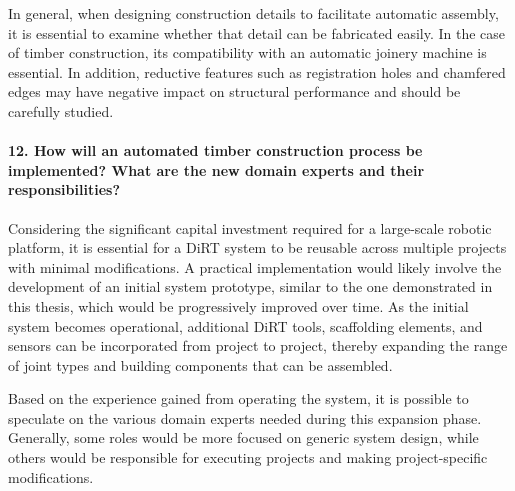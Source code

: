 In general, when designing construction details to facilitate automatic assembly, it is essential to examine whether that detail can be fabricated easily. In the case of timber construction, its compatibility with an automatic joinery machine is essential. In addition, reductive features such as registration holes and chamfered edges may have negative impact on structural performance and should be carefully studied.

	\paragraph{12. How will an automated timber construction process be implemented? What are the new domain experts and their responsibilities?}


Considering the significant capital investment required for a large-scale robotic platform, it is essential for a DiRT system to be reusable across multiple projects with minimal modifications. A practical implementation would likely involve the development of an initial system prototype, similar to the one demonstrated in this thesis, which would be progressively improved over time. As the initial system becomes operational, additional DiRT tools, scaffolding elements, and sensors can be incorporated from project to project, thereby expanding the range of joint types and building components that can be assembled.

Based on the experience gained from operating the system, it is possible to speculate on the various domain experts needed during this expansion phase. Generally, some roles would be more focused on generic system design, while others would be responsible for executing projects and making project-specific modifications.

